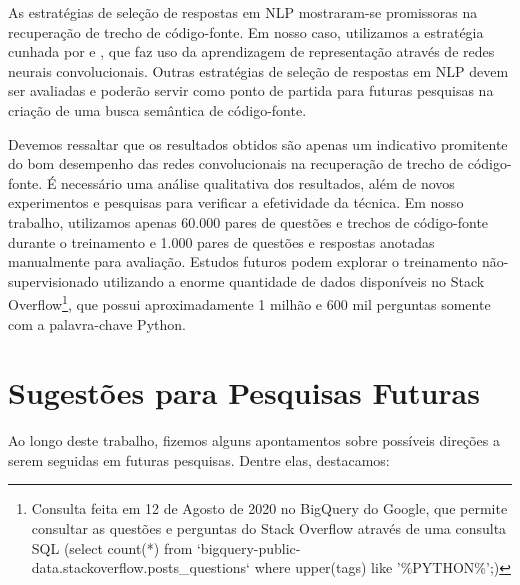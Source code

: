 As estratégias de seleção de respostas em NLP mostraram-se promissoras na recuperação de trecho de código-fonte. Em nosso caso, utilizamos a estratégia cunhada por \cite{feng-2015} e \cite{tan-lstm-qa}, que faz uso da aprendizagem de representação através de redes neurais convolucionais. Outras estratégias de seleção de respostas em NLP devem ser avaliadas e poderão servir como ponto de partida para futuras pesquisas na criação de uma busca semântica de código-fonte.

Devemos ressaltar que os resultados obtidos são apenas um indicativo promitente do bom desempenho das redes convolucionais na recuperação de trecho de código-fonte. É necessário uma análise qualitativa dos resultados, além de novos experimentos e pesquisas para verificar a efetividade da técnica. Em nosso trabalho, utilizamos apenas 60.000 pares de questões e trechos de código-fonte durante o treinamento e 1.000 pares de questões e respostas anotadas manualmente para avaliação. Estudos futuros podem explorar o treinamento não-supervisionado utilizando a enorme quantidade de dados disponíveis no Stack Overflow\footnote{Consulta feita em 12 de Agosto de 2020 no BigQuery do Google, que permite consultar as questões e perguntas do Stack Overflow através de uma consulta SQL (select count(*) from `bigquery-public-data.stackoverflow.posts\_questions` where upper(tags) like '\%PYTHON\%';)}, que possui aproximadamente 1 milhão e 600 mil perguntas somente com a palavra-chave Python.



\section{Sugestões para Pesquisas Futuras} 

Ao longo deste trabalho, fizemos alguns apontamentos sobre possíveis direções a serem seguidas em futuras pesquisas. Dentre elas, destacamos:

